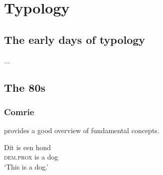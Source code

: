 \chapter{Typology}
\section{The early days of typology}
 ...
\section{The 80s}
\subsection{Comrie}
\citet{Comrie1981} provides a good overview of fundamental concepts.

\ea                                              %

\gll Dit is een hond \\                          %
     \textsc{dem.prox} is a dog\\                %
\glt `This is a dog.'                            %
\z                                               %